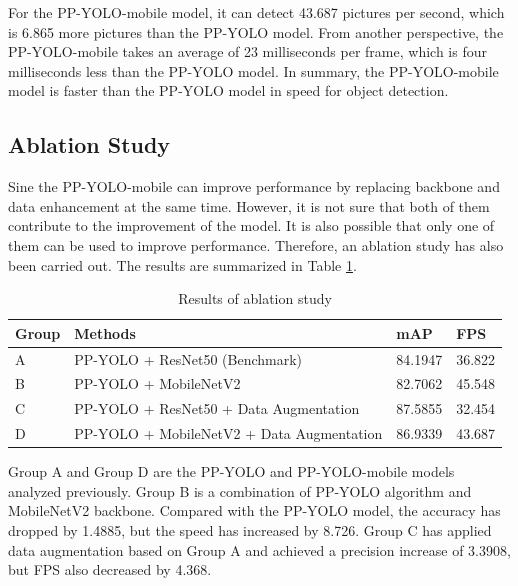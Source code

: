 \documentclass[sensors,article,submit,moreauthors,pdftex]{Definitions/mdpi}
\begin{document}
\begin{paracol}{2}
\linenumbers
\switchcolumn



For the PP-YOLO-mobile model, it can detect 43.687 pictures per second, which is 6.865 more pictures than the PP-YOLO model. From another perspective, the PP-YOLO-mobile takes an average of 23 milliseconds per frame, which is four milliseconds less than the PP-YOLO model. In summary, the PP-YOLO-mobile model is faster than the PP-YOLO model in speed for object detection.



\subsection{Ablation Study}

Sine the PP-YOLO-mobile can improve performance by replacing backbone and data enhancement at the same time. However, it is not sure that both of them contribute to the improvement of the model. It is also possible that only one of them can be used to improve performance. Therefore, an ablation study has also been carried out. The results are summarized in Table \ref{tbl:Results of ablation study}.


\begin{table}[htbp]
\centering
\caption{Results of ablation study}
\begin{tabular}{llll} 
\toprule
\textbf{Group}&\textbf{Methods}&\textbf{mAP}&\textbf{FPS}\\
\midrule
A& PP-YOLO + ResNet50 (Benchmark) &84.1947 & 36.822\\
\cmidrule(r){1-4}
B& PP-YOLO + MobileNetV2 &82.7062 & 45.548\\
C& PP-YOLO + ResNet50 + Data Augmentation & 87.5855 & 32.454\\
D& PP-YOLO + MobileNetV2 + Data Augmentation & 86.9339& 43.687\\
\bottomrule
\end{tabular}
\label{tbl:Results of ablation study}
\end{table}

Group A and Group D are the PP-YOLO and PP-YOLO-mobile models analyzed previously. Group B is a combination of PP-YOLO algorithm and MobileNetV2 backbone. Compared with the PP-YOLO model, the accuracy has dropped by 1.4885, but the speed has increased by 8.726. Group C has applied data augmentation based on Group A and achieved a precision increase of 3.3908, but FPS also decreased by 4.368.


\end{paracol}
\end{document}
